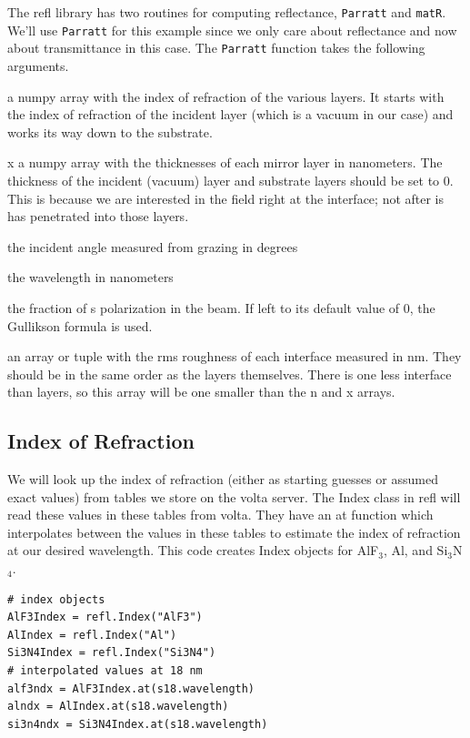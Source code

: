 \documentclass[english]{scrartcl}
\begin{document}
The refl library has two routines for computing reflectance, \texttt{Parratt}
and \texttt{matR}. We'll use \texttt{Parratt} for this example since we only
care about reflectance and now about transmittance in this case. The \texttt{Parratt}
function takes the following arguments.
\begin{description}
\item[n] a numpy array with the index of refraction of the various layers. It starts
with the index of refraction of the incident layer (which is a vacuum in our case)
and works its way down to the substrate.
\item{x} a numpy array with the thicknesses of each mirror layer in
nanometers. The thickness of
the incident (vacuum) layer and substrate layers should be set to 0. This is because we
are interested in the field right at the interface; not after is has penetrated into those
layers.
\item[thetad] the incident angle measured from grazing in degrees
\item[lam] the wavelength in nanometers
\item[frs] the fraction of s polarization in the beam. If left to its default
value of 0, the Gullikson formula is used.
\item[sigma] an array or tuple
with the rms roughness of each interface measured in nm. They
should be in the same order as the layers themselves. There is one less interface than
layers, so this array will be one smaller than the n and x arrays.
\end{description}
\subsection{Index of Refraction}
We will look up the index of refraction (either as starting guesses or assumed
exact values) from tables we store on the volta server. The Index class in refl
will read these values in these tables from volta. They have an at function
which interpolates between the values in these tables to estimate the index
of refraction at our desired wavelength.  This code creates Index objects
for AlF$_3$, Al, and Si$_3$N$_4$.
\begin{lstlisting}
# index objects
AlF3Index = refl.Index("AlF3")
AlIndex = refl.Index("Al")
Si3N4Index = refl.Index("Si3N4")
# interpolated values at 18 nm
alf3ndx = AlF3Index.at(s18.wavelength)
alndx = AlIndex.at(s18.wavelength)
si3n4ndx = Si3N4Index.at(s18.wavelength)
\end{lstlisting}
\end{document}
